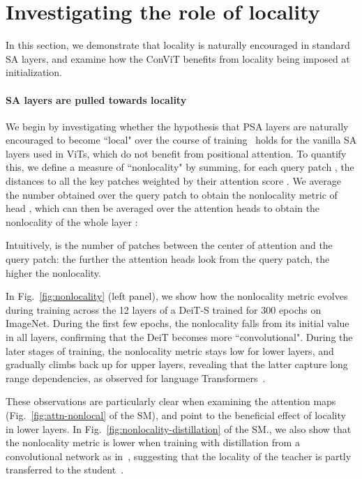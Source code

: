 \documentclass[a4paper,11pt,twocolumn]{article}
\newcommand{\citet}[1]{\textcite{#1}}
\begin{document}
\section{Investigating the role of locality}
\label{sec:experimental}

In this section, we demonstrate that locality is naturally encouraged in standard SA layers, and examine how the ConViT benefits from locality being imposed at initialization.

\paragraph{SA layers are pulled towards locality}

We begin by investigating whether the hypothesis that PSA layers are naturally encouraged to become ``local" over the course of training~\cite{cordonnier2019relationship} holds for the vanilla SA layers used in ViTs, which do not benefit from positional attention. To quantify this, we define a measure of ``nonlocality" by summing, for each query patch , the distances  to all the key patches  weighted by their attention score . We average the number obtained over the query patch to obtain the nonlocality metric of head , which can then be averaged over the attention heads to obtain the nonlocality of the whole layer :

Intuitively,  is the number of patches between the center of attention and the query patch: the further the attention heads look from the query patch, the higher the nonlocality. 

In Fig.~\ref{fig:nonlocality} (left panel), we show how the nonlocality metric evolves during training across the 12 layers of a DeiT-S trained for 300 epochs on ImageNet. During the first few epochs, the nonlocality falls from its initial value in all layers, confirming that the DeiT becomes more ``convolutional". During the later stages of training, the nonlocality metric stays low for lower layers, and gradually climbs back up for upper layers, revealing that the latter capture long range dependencies, as observed for language Transformers~\cite{sukhbaatar2019adaptive}. 

These observations are particularly clear when examining the attention maps (Fig.~\ref{fig:attn-nonlocal} of the SM), and point to the beneficial effect of locality in lower layers. In Fig.~\ref{fig:nonlocality-distillation} of the SM., we also show that the nonlocality metric is lower when training with distillation from a convolutional network as in~\citet{touvron2020training},  suggesting that the locality of the teacher is partly transferred to the student~\cite{abnar2020transferring}.
\end{document}
